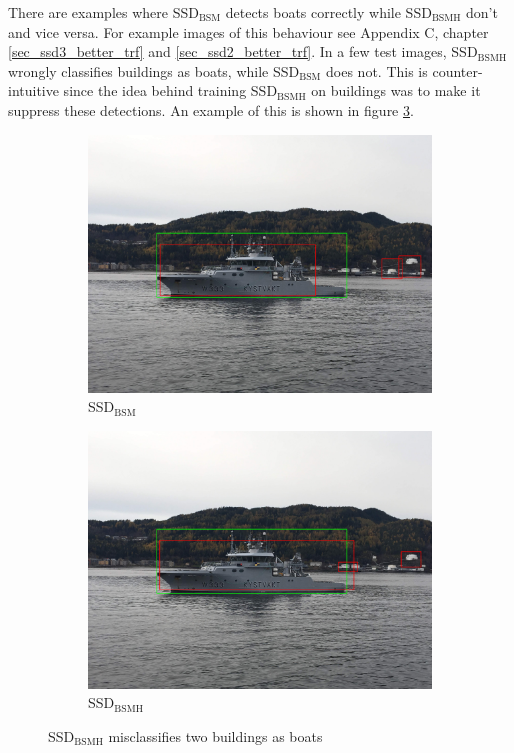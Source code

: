 There are examples where SSD$_{\text{BSM}}$ detects boats correctly while SSD$_{\text{BSMH}}$ don't and vice versa. For example images of this behaviour see Appendix C, chapter \ref{sec_ssd3_better_trf} and \ref{sec_ssd2_better_trf}. In a few test images, SSD$_{\text{BSMH}}$ wrongly classifies buildings as boats, while SSD$_{\text{BSM}}$ does not. This is counter-intuitive since the idea behind training SSD$_{\text{BSMH}}$ on buildings was to make it suppress these detections. An example of this is shown in figure \ref{fig:ssd3_misclassify}.

\begin{figure}[h!]
\begin{subfigure}{.5\textwidth}
  \centering
  \includegraphics[width=0.8\linewidth]{results/case_buildings/ssdtrf/ssd2/grov3/IMG_2680.jpg}
  \caption{SSD$_{\text{BSM}}$}
  \label{fig:ex_trf_prec_rec_yolo}
\end{subfigure}%
\begin{subfigure}{.5\textwidth}
  \centering
  \includegraphics[width=.8\linewidth]{results/case_buildings/ssdtrf/ssd3/grov3/IMG_2680.jpg}
  \caption{SSD$_{\text{BSMH}}$}
  \label{fig:ex_trf_prec_rec_ssd}
\end{subfigure}
\caption{SSD$_{\text{BSMH}}$ misclassifies two buildings as boats}
\label{fig:ssd3_misclassify}
\end{figure}

